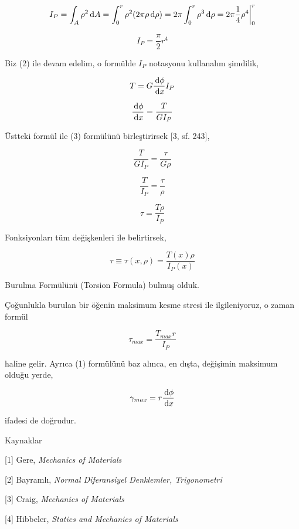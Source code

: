 \documentclass[12pt,fleqn]{article}\usepackage{../../common}
\begin{document}
$$
I_P = \int_A \rho^2 \,\mathrm{d} A =
\int_{0}^{r} \rho^2 (2\pi\rho \,\mathrm{d} \rho) =
2\pi \int_{0}^{r} \rho^3 \,\mathrm{d} \rho =
2\pi \frac{1}{4} \rho^4 \bigg\vert_{0}^{r}
$$

$$
I_P = \frac{\pi}{2} r^4
$$

Biz (2) ile devam edelim, o formülde $I_P$ notasyonu kullanalım şimdilik,

$$
T = G \frac{\,\mathrm{d} \phi}{\,\mathrm{d} x} I_P
$$

$$
\frac{\,\mathrm{d} \phi}{\,\mathrm{d} x} = \frac{T}{G I_P}
$$

Üstteki formül ile (3) formülünü birleştirirsek [3, sf. 243],

$$
\frac{T}{G I_P} = \frac{\tau}{G \rho }
$$

$$
\frac{T}{I_P} = \frac{\tau}{\rho }
$$

$$
\tau = \frac{T\rho}{I_P} 
$$

Fonksiyonları tüm değişkenleri ile belirtirsek,

$$
\tau \equiv \tau(x,\rho) = \frac{T(x) \rho}{I_P(x)} 
$$


Burulma Formülünü (Torsion Formula) bulmuş olduk.

Çoğunlukla burulan bir öğenin maksimum kesme stresi ile ilgileniyoruz, o
zaman formül

$$
\tau_{max} = \frac{T_{max} r}{I_P} 
$$

haline gelir. Ayrıca (1) formülünü baz alınca, en dışta, değişimin maksimum
olduğu yerde,

$$
\gamma_{max} = r \frac{\,\mathrm{d} \phi}{\,\mathrm{d} x}
$$

ifadesi de doğrudur. 

Kaynaklar

[1] Gere, {\em Mechanics of Materials}

[2] Bayramlı, {\em Normal Diferansiyel Denklemler, Trigonometri}

[3] Craig, {\em Mechanics of Materials}

[4] Hibbeler, {\em Statics and Mechanics of Materials}
\end{document}
